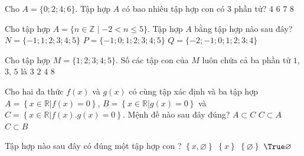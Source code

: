 \begin{ex}%
	Cho $A=\{0;2;4;6\}$. Tập hợp $A$ có bao nhiêu tập hợp con có $3$ phần  tử?
	 \choice
		{\True  $4$}
		{$6$} 
		 {$7$}
		 {$8$}
\end{ex}

\begin{ex}%
	Cho tập hợp $A = \{n \in \mathbb{Z} \mid -2 < n \le 5\}$. Tập  hợp $A$ bằng tập hợp nào sau đây?
		 {$N = \{-1; 1;2;3;4; 5 \}$}
		 {\True $P = \{-1;0;1;2;3;4;5 \}$}
		{$Q = \{-2;-1; 0; 1;2;3;4 \}$} 
\end{ex}

\begin{ex}%
	Cho tập hợp  $M=\{1;2;3;4;5\}$. Số các tập con của $M$ luôn chứa cả ba phần tử $1$, $3$, $5$ là
	 \choice
		 {$3$}
		 {$2$}
		{\True $4$} 
		{$8$} 
\end{ex}

\begin{ex}%
	Cho hai đa thức $f\left(x\right)$ và $g\left(x\right)$ có cùng tập xác định và ba tập hợp $A = \left\{x \in \mathbb{R}\big| f\left(x\right) = 0\right\}$, $B = \left\{x \in \mathbb{R}\big| g\left(x\right) = 0\right\}$ và $C = \left\{x \in \mathbb{R}\big| f\left(x\right).g\left(x\right)  = 0\right\}$. Mệnh đề nào sau đây đúng?
		{\True  $A \subset C$}
		{$C \subset A$} 
		 {$C \subset B$}
\end{ex}

\begin{ex}%
	Tập hợp nào sau đây  có đúng một tập hợp con ?
	 \choice
		{$\left\{x,\varnothing\right\}$} 
		 {$\left\{x\right\}$}
		{$ \left\{\varnothing\right\}  $}
		{$ \True \varnothing $} 
\end{ex}

